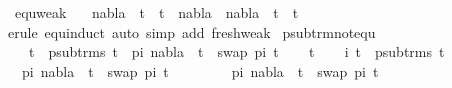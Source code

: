 \begin{isabellebody}
\ equ{\isacharunderscore}{\kern0pt}weak{\isacharcolon}{\kern0pt}\ \isanewline
\ \ {\isachardoublequoteopen}nabla{}\ {\isasymturnstile}\ t{}\ {\isasymapprox}\ t{}\ {\isasymLongrightarrow}\ {\isacharparenleft}{\kern0pt}nabla{}\ {\isasymunion}\ nabla{}{\isacharparenright}{\kern0pt}\ {\isasymturnstile}\ t{}\ {\isasymapprox}\ t{}{\isachardoublequoteclose}\isanewline
%
\isadelimproof
\ \ %
\endisadelimproof
%
\isatagproof
{}\isamarkupfalse%
{\isacharparenleft}{\kern0pt}erule\ equ{\isachardot}{\kern0pt}induct{\isacharcomma}{\kern0pt}\ auto\ simp\ add{\isacharcolon}{\kern0pt}\ fresh{\isacharunderscore}{\kern0pt}weak{\isacharparenright}{\kern0pt}%
\endisatagproof
{\isafoldproof}%
%
\isadelimproof
\isanewline
%
\endisadelimproof
\isanewline
\isanewline
\isanewline
\isanewline
\isanewline
\isanewline
{}\isamarkupfalse%
\ psub{\isacharunderscore}{\kern0pt}trm{\isacharunderscore}{\kern0pt}not{\isacharunderscore}{\kern0pt}equ{\isacharcolon}{\kern0pt}\ \isanewline
\ \ {\isachardoublequoteopen}{\isasymforall}\ t{}\ {\isasymin}\ psub{\isacharunderscore}{\kern0pt}trms\ t{}{\isachardot}{\kern0pt}\ {\isacharparenleft}{\kern0pt}{\isasymnot}{\isacharparenleft}{\kern0pt}{\isasymexists}\ pi{\isachardot}{\kern0pt}\ {\isacharparenleft}{\kern0pt}nabla\ {\isasymturnstile}\ t{}\ {\isasymapprox}\ swap\ pi\ t{}{\isacharparenright}{\kern0pt}{\isacharparenright}{\kern0pt}{\isacharparenright}{\kern0pt}{\isachardoublequoteclose}\isanewline
%
\isadelimproof
%
\endisadelimproof
%
\isatagproof
{}\isamarkupfalse%
\isanewline
\ \ \isamarkupfalse%
\ t{}\isanewline
\ \ \isamarkupfalse%
\ i{\isacharcolon}{\kern0pt}\ {\isachardoublequoteopen}t{}\ {\isasymin}\ psub{\isacharunderscore}{\kern0pt}trms\ t{}{\isachardoublequoteclose}\isanewline
\ \ \isamarkupfalse%
\ {\isachardoublequoteopen}{\isasymnot}\ {\isacharparenleft}{\kern0pt}{\isasymexists}pi{\isachardot}{\kern0pt}\ nabla\ {\isasymturnstile}\ t{}\ {\isasymapprox}\ swap\ pi\ t{}{\isacharparenright}{\kern0pt}{\isachardoublequoteclose}\isanewline
\ \ \isamarkupfalse%
\isanewline
\ \ \ \ \isamarkupfalse%
\ {\isachardoublequoteopen}{\isasymexists}pi{\isachardot}{\kern0pt}\ nabla\ {\isasymturnstile}\ t{}\ {\isasymapprox}\ swap\ pi\ t{}{\isachardoublequoteclose}\isanewline
\ \ \ \ \isamarkupfalse%

\end{isabellebody}
